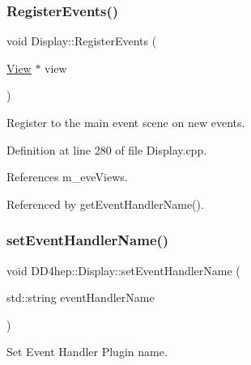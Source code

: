 \hypertarget{class_d_d4hep_1_1_display_ab1c06999ce5655dc960771f8082a1710}{}\label{class_d_d4hep_1_1_display_ab1c06999ce5655dc960771f8082a1710} 
\subsubsection{\texorpdfstring{Register\+Events()}{RegisterEvents()}}
{\footnotesize\ttfamily void Display\+::\+Register\+Events (\begin{DoxyParamCaption}\item[{\hyperlink{class_d_d4hep_1_1_view}{View} $\ast$}]{view }\end{DoxyParamCaption})\hspace{0.3cm}{\ttfamily [virtual]}}



Register to the main event scene on new events. 



Definition at line 280 of file Display.\+cpp.



References m\+\_\+eve\+Views.



Referenced by get\+Event\+Handler\+Name().

\hypertarget{class_d_d4hep_1_1_display_a41734ab371228987decf1ab66c989f56}{}\label{class_d_d4hep_1_1_display_a41734ab371228987decf1ab66c989f56} 
\subsubsection{\texorpdfstring{set\+Event\+Handler\+Name()}{setEventHandlerName()}}
{\footnotesize\ttfamily void D\+D4hep\+::\+Display\+::set\+Event\+Handler\+Name (\begin{DoxyParamCaption}\item[{std\+::string}]{event\+Handler\+Name }\end{DoxyParamCaption})\hspace{0.3cm}{\ttfamily [inline]}}



Set Event Handler Plugin name. 



